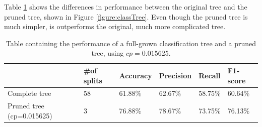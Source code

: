 \documentclass[a4paper,11pt]{article}
\begin{document}
Table \ref{table:treeResults} shows the differences in performance between the original tree and the pruned tree, shown in Figure \ref{figure:classTree}. Even though the pruned tree is much simpler, is outperforms the original, much more complicated tree.

\begin{table}[H]
\centering
\caption{Table containing the performance of a full-grown classification tree and a pruned tree, using $cp=0.015625$.}
\label{table:treeResults}
\begin{tabular}{|l|l|l|l|l|l|}
\hline
                         & \#of splits & Accuracy & Precision & Recall  & F1-score \\
                         \hline
Complete tree             & 58 & 61.88\%  & 62.67\%   & 58.75\% & 60.64\%  \\
Pruned tree (cp=0.015625) & 3  & 76.88\%  & 78.67\%   & 73.75\% & 76.13\%  \\
\hline
\end{tabular}
\end{table}
\end{document}
